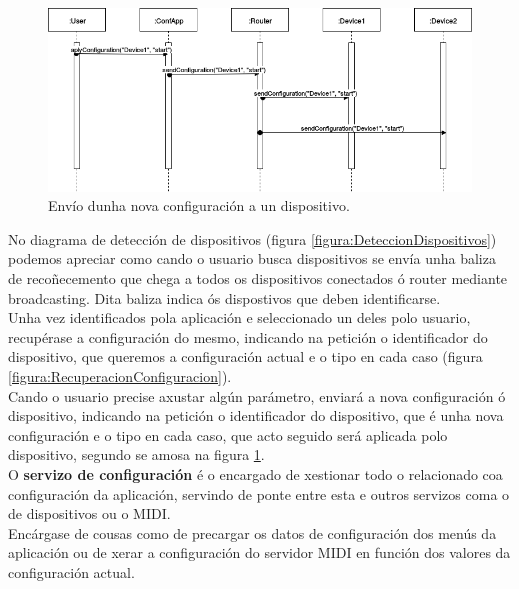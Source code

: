    \begin{figure}[htbp]
    \centering
    \includegraphics[scale=0.5, keepaspectratio=true]{./imagenes/df-apply-config.png}
    \caption{Envío dunha nova configuración a un dispositivo.}
    \label{figura:EnvioConfiguracion}
   \end{figure}
   
   No diagrama de detección de dispositivos (figura
   \ref{figura:DeteccionDispositivos}) podemos apreciar como cando o usuario
   busca dispositivos se envía unha baliza de recoñecemento que chega a todos
   os dispositivos conectados ó router mediante broadcasting. Dita baliza indica
   ós dispostivos que deben identificarse. \\
   
   Unha vez identificados pola aplicación e seleccionado un deles polo usuario,
   recupérase a configuración do mesmo, indicando na petición o identificador do
   dispositivo, que queremos a configuración actual e o tipo en cada caso
   (figura \ref{figura:RecuperacionConfiguracion}). \\
   
   Cando o usuario precise axustar algún parámetro, enviará a nova configuración
   ó dispositivo, indicando na petición o identificador do dispositivo, que é
   unha nova configuración e o tipo en cada caso, que acto seguido será aplicada
   polo dispositivo, segundo se amosa na figura
   \ref{figura:EnvioConfiguracion}. \\
   
   O \textbf{servizo de configuración} é o encargado de xestionar todo o
   relacionado coa configuración da aplicación, servindo de ponte entre esta e
   outros servizos coma o de dispositivos ou o MIDI. \\
   
   Encárgase de cousas como de precargar os datos de configuración dos menús
   da aplicación ou de xerar a configuración do servidor MIDI en función dos
   valores da configuración actual. \\
   
